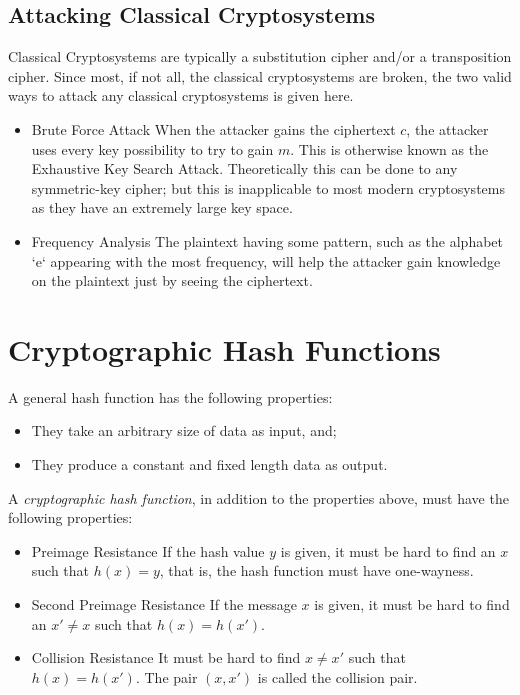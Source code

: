 \documentclass{report}
\begin{document}
		\subsection{Attacking Classical Cryptosystems} 
			Classical Cryptosystems are typically a substitution cipher and/or a transposition cipher. Since most, if not all, the classical cryptosystems are broken, the two valid ways to attack any classical cryptosystems is given here.
			\begin{itemize}
				\item Brute Force Attack
				\subitem When the attacker gains the ciphertext $c$, the attacker uses every key possibility to try to gain $m$. This is otherwise known as the Exhaustive Key Search Attack. Theoretically this can be done to any symmetric-key cipher; but this is inapplicable to most modern cryptosystems as they have an extremely large key space.
				
				\item Frequency Analysis
				\subitem The plaintext having some pattern, such as the alphabet `e` appearing with the most frequency, will help the attacker gain knowledge on the plaintext just by seeing the ciphertext.
			\end{itemize}
		
	\section{Cryptographic Hash Functions}
		A general hash function has the following properties:
		\begin{itemize}
			\item They take an arbitrary size of data as input, and;
			\item They produce a constant and fixed length data as output.
		\end{itemize}
		A \emph{cryptographic hash function}, in addition to the properties above, must have the following properties:
		\begin{itemize}
			\item Preimage Resistance
			\subitem If the hash value $y$ is given, it must be hard to find an $x$ such that $h(x)=y$, that is, the hash function must have one-wayness.
			\item Second Preimage Resistance
			\subitem If the message $x$ is given, it must be hard to find an $x' \ne x$ such that $h(x)=h(x')$.
			\item Collision Resistance
			\subitem It must be hard to find $x \ne x'$ such that $h(x)=h(x')$. The pair $(x,x')$ is called the collision pair.
		\end{itemize}
		
\end{document}
